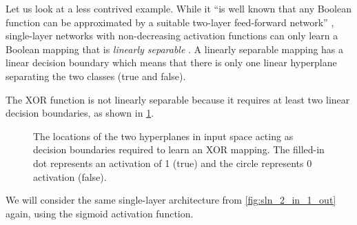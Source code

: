 \begin{example}
    \label{ex:unrealisable_xor}
    Let us look at a less contrived example.
    While it ``is well known that any Boolean function \elide can be approximated by a suitable two-layer feed-forward network'' \cite{blum1989}, 
    single-layer networks with non-decreasing activation functions can only learn a Boolean mapping that is \textit{linearly separable} \cite[p. 723]{russell2010}.
    A linearly separable mapping has a linear decision boundary which means that there is only one linear hyperplane separating the two classes (true and false).
    
    The XOR function is not linearly separable because it requires at least two linear decision boundaries, as shown in \ref{fig:xor}.
    \begin{figure}
        \centering
        \caption{The locations of the two hyperplanes in input space acting as decision boundaries required to learn an XOR mapping. The filled-in dot represents an activation of 1 (true) and the circle represents 0 activation (false).}
        \label{fig:xor}
    \end{figure}
    We will consider the same single-layer architecture from \ref{fig:sln_2_in_1_out} again, using the sigmoid activation function.

\end{example}
